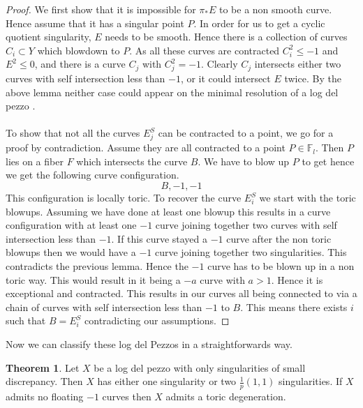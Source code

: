 \documentclass[11pt]{report}
\theoremstyle{definition}
\newtheorem{thm}{Theorem}[section]
\theoremstyle{definition}
\theoremstyle{definition}
\theoremstyle{definition}
\theoremstyle{definition}
\theoremstyle{definition}
\theoremstyle{definition}
\theoremstyle{definition}
\newcommand{\ldp}{log del pezzo }
\newcommand{\mb}[1]{\mathbb{#1}}
\newcommand{\minres}{minimal resolution }
\begin{document}
\begin{proof}
We first show that it is impossible for $\pi_* E$ to be a non smooth curve. Hence assume that it has a singular point $P$. In order for us to get a cyclic quotient singularity, $E$ needs to be smooth. Hence there is a collection of curves $C_i \subset Y$ which blowdown to $P$. As all these curves are contracted $C_i^2 \leq  -1$ and $E^2 \leq 0$, and there is a curve $C_j$ with $C_j^2 = -1$. Clearly $C_j$ intersects either two curves with self intersection less than $-1$, or it could intersect $E$ twice. By the above lemma neither case could appear on the \minres of a \ldp.
\\
\\
To show that not all the curves $E_j^S$ can be contracted to a point, we go for a proof by contradiction. Assume they are all contracted to a point $P \in \mb{F}_l$. Then $P$ lies on a fiber $F$ which intersects the curve $B$. We have to blow up $P$ to get hence we get the following curve configuration. 
\[
B, -1, -1
\]
This configuration is locally toric. To recover the curve $E_i^S$ we  start with the toric blowups. Assuming we have done at least one blowup this results in a curve configuration with at least one $-1$ curve joining together two curves with self intersection less than $-1$. If this curve stayed a $-1$ curve after the non toric blowups then we would have a $-1$ curve joining together two singularities. This contradicts the previous lemma. Hence the $-1$ curve has to be blown up in a non toric way. This would result in it being a $-a$ curve with $a>1$. Hence it is exceptional and contracted. This results in our curves all being connected to via a chain of curves  with self intersection less than $-1$ to $B$. This means there exists $i$ such that $B = E_i^S$ contradicting our assumptions.
\end{proof}
Now we can classify these log del Pezzos in a straightforwards way. 
\begin{thm}
Let $X$ be a \ldp with only singularities of small discrepancy. Then $X$ has either one singularity or two $\frac{1}{p}(1,1)$ singularities. If $X$ admits no floating $-1$ curves then $X$ admits a toric degeneration.
\end{thm}
\end{document}
